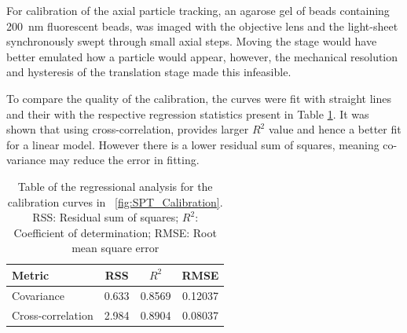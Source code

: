 For calibration of the axial particle tracking, an agarose gel of beads containing \SI{200}{\nano\meter} fluorescent beads, was imaged with the objective lens and the light-sheet synchronously swept through small axial steps.
Moving the stage would have better emulated how a particle would appear, however, the mechanical resolution and hysteresis of the translation stage made this infeasible.

To compare the quality of the calibration, %
the curves were fit with straight lines and their with the respective regression statistics present in Table \ref{tab:linear_calibration}.
It was shown that using cross-correlation, provides larger \(R^2\) value and hence a better fit for a linear model. %
However there is a lower residual sum of squares, meaning co-variance may reduce the error in fitting.


\begin{table}[h]
\centering
\caption{Table of the regressional analysis for the calibration curves in \figurename~\ref{fig:SPT_Calibration}.
\label{tab:linear_calibration}
RSS: Residual sum of squares; $R^2$: Coefficient of determination; RMSE: Root mean square error}
  \begin{tabular}{lccc}
    \toprule
    Metric & RSS & $R^2$ & RMSE \\\midrule
    Covariance & 0.633 & 0.8569 & 0.12037 \\
    Cross-correlation & 2.984 & 0.8904 & 0.08037 \\
    \bottomrule
  \end{tabular}
\end{table}



